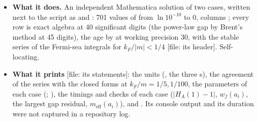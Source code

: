 \begin{itemize}
  \item \textbf{What it does.} An independent Mathematica solution of two  cases, written next to the script as  and : 701 values of  from $\ln 10^{-10}$ to 0, columns ; every row is exact algebra at 40 significant digits (the power-law gap by Brent's method at 45 digits), the age by  at working precision 30, with the stable series of the Fermi-sea integrals for $k_F/|m| < 1/4$ [file: its header]. Self-locating.
  \item \textbf{What it prints} [file: its  statements]: the units (, the three s), the agreement of the series with the closed forms at $k_F/m = 1/5, 1/100$, the parameters of each case (; ), the timings and checks of each case ($|H_A(1) - 1|$, $w_f(a_i)$, the largest gap residual, $m_{\mathrm{eff}}(a_i)$), and . Its console output and its duration were not captured in a repository log.

\end{itemize}

